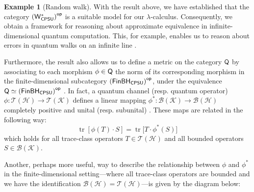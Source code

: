 \documentclass[10pt,a4paper]{amsart}
\theoremstyle{definition}
\theoremstyle{definition}
\newtheorem{example}[definition]{Example}
\theoremstyle{definition}
\theoremstyle{definition}
\theoremstyle{definition}
\theoremstyle{definition}
\begin{document}
\begin{example}[Random walk]
With the result above, we have established that the category $\left(\mathsf{W^*_{CPSU}}\right)^{\mathsf{op}}$ is a suitable model for our $\lambda$-calculus. Consequently, we obtain a framework for reasoning about approximate equivalence in infinite-dimensional quantum computation. This, for example, enables us to reason about errors in quantum walks on an infinite line \cite{venegasQuantumWalksComprehensive2012}.

Furthermore, the result also allows us to define a metric on the category $\mathsf{Q}$ by associating to each morphism $\phi \in \mathsf{Q}$ the norm of its corresponding morphism in the finite-dimensional subcategory $\left(\mathsf{FinBH_{CPSU}}\right)^{\mathsf{op}}$, under the equivalence $\mathsf{Q} \simeq \left(\mathsf{FinBH_{CPSU}}\right)^{\mathsf{op}}$ \cite{choSemanticsQuantumProgramming2016}. In fact, a quantum channel (resp. quantum operator) $\phi: \mathcal{T}(\mathcal{H})  \to \mathcal{T}(\mathcal{K})$ defines a linear mapping 
$\phi^*: \mathcal{B}(\mathcal{K}) \to \mathcal{B}(\mathcal{H})$ completely positive and unital (resp. subunital) 
\cite[4.1.2]{heinosaariMathematicalLanguageQuantum2011}. These maps are related in the following way:
\begin{equation*}
\operatorname{tr}[\phi(T) \cdot S] = \operatorname{tr}\big[T \cdot \phi^*(S)\big]
\end{equation*}
which holds for all trace-class operators $T \in \mathcal{T}(\mathcal{H})$ and all bounded operators $S \in \mathcal{B}(\mathcal{K})$.

Another, perhaps more useful, way to describe the relationship between $\phi$ and $\phi^*$ in the finite-dimensional setting—where all trace-class operators are bounded and we have the identification \( \mathcal{B}(\mathcal{H}) = \mathcal{T}(\mathcal{H}) \)—is given by the diagram below:


\end{example}
\end{document}
